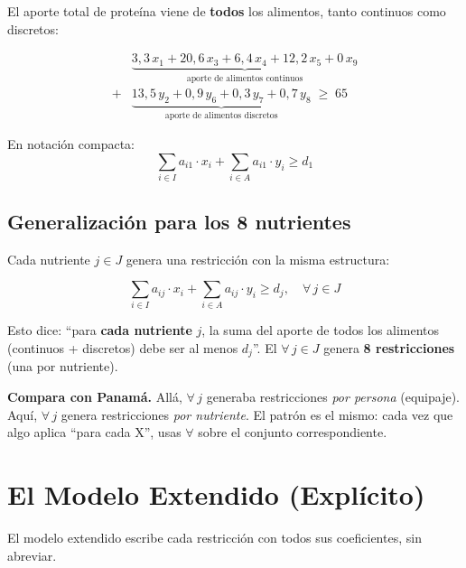\documentclass[12pt]{article}
\begin{document}
El aporte total de prote\'ina viene de \textbf{todos} los alimentos, tanto continuos como discretos:

\begin{align*}
    &\underbrace{3{,}3\,x_1 + 20{,}6\,x_3 + 6{,}4\,x_4 + 12{,}2\,x_5 + 0\,x_9}_{\text{aporte de alimentos continuos}} \\[4pt]
    + &\underbrace{13{,}5\,y_2 + 0{,}9\,y_6 + 0{,}3\,y_7 + 0{,}7\,y_8}_{\text{aporte de alimentos discretos}}
    \;\geq\; 65
\end{align*}

En notaci\'on compacta:
\[
    \sum_{i \in I} a_{i1} \cdot x_i + \sum_{i \in A} a_{i1} \cdot y_i \geq d_1
\]

\subsection*{Generalizaci\'on para los 8 nutrientes}

Cada nutriente $j \in J$ genera una restricci\'on con la misma estructura:

\begin{cajazul}
\[
    \sum_{i \in I} a_{ij} \cdot x_i + \sum_{i \in A} a_{ij} \cdot y_i \geq d_j, \quad \forall\, j \in J
\]

Esto dice: ``para \textbf{cada nutriente} $j$, la suma del aporte de todos los alimentos (continuos + discretos) debe ser al menos $d_j$''. El $\forall\, j \in J$ genera \textbf{8 restricciones} (una por nutriente).
\end{cajazul}

\begin{cajaverde}
\textbf{Compara con Panam\'a.} All\'a, $\forall\, j$ generaba restricciones \textit{por persona} (equipaje). Aqu\'i, $\forall\, j$ genera restricciones \textit{por nutriente}. El patr\'on es el mismo: cada vez que algo aplica ``para cada X'', usas $\forall$ sobre el conjunto correspondiente.
\end{cajaverde}

\section{El Modelo Extendido (Expl\'icito)}

El modelo extendido escribe cada restricci\'on con todos sus coeficientes, sin abreviar.
\end{document}
